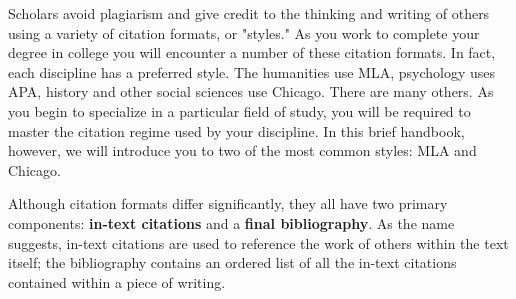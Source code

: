 Scholars avoid plagiarism and give credit to the thinking and writing of others using a 
variety of citation formats, or "styles." As you work to complete your degree in college 
you will encounter a number of these citation formats. In fact, each discipline has a 
preferred style. The humanities use MLA, psychology uses APA, history and other social 
sciences use Chicago. There are many others. As you begin to specialize in a particular 
field of study, you will be required to master the citation regime used by your discipline. 
In this brief handbook, however, we will introduce you to two of the most common 
styles: MLA and Chicago.

Although citation formats differ significantly, they all have two primary components: 
\textbf{in-text citations} and a \textbf{final bibliography}. As the name suggests, in-text 
citations are used to reference the work of others within the text itself; the 
bibliography contains an ordered list of all the in-text citations contained within a 
piece of writing.


